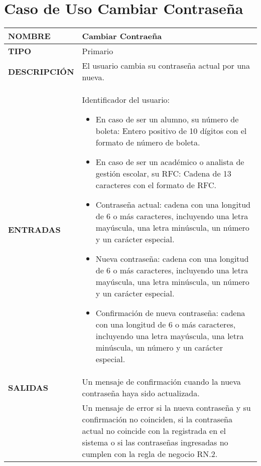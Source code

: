 \newpage
\section{Caso de Uso Cambiar Contraseña}
\begin{longtable}{ | p{6cm} | p{10cm} |}
\hline
\textbf{NOMBRE} & Cambiar Contraeña\\
\hline
\textbf{TIPO} & Primario\\
\hline
\textbf{DESCRIPCIÓN} & El usuario cambia su contraseña actual por una nueva.\\
\hline
\textbf{ENTRADAS} & Identificador del usuario: \begin{itemize}
    \item En caso de ser un alumno, su número de boleta: Entero positivo de 10 dígitos con el formato de número de boleta.
    \item En caso de ser un académico o analista de gestión escolar, su RFC: Cadena de 13 caracteres con el formato de RFC.
    \item Contraseña actual: cadena con una longitud de 6 o más caracteres, incluyendo una letra mayúscula, una letra minúscula, un número y un carácter especial.
    \item Nueva contraseña: cadena con una longitud de 6 o más caracteres, incluyendo una letra mayúscula, una letra minúscula, un número y un carácter especial.
    \item Confirmación de nueva contraseña: cadena con una longitud de 6 o más caracteres, incluyendo una letra mayúscula, una letra minúscula, un número y un carácter especial.
    \end{itemize}\\
\hline
\textbf{SALIDAS} & Un mensaje de confirmación cuando la nueva contraseña haya sido actualizada.\\ & Un mensaje de error si la nueva contraseña y su confirmación no coinciden, si la contraseña actual no coincide con la registrada en el sistema o si las contraseñas ingresadas no cumplen con la regla de negocio RN.2.\\
\hline
\end{longtable}
\newpage
